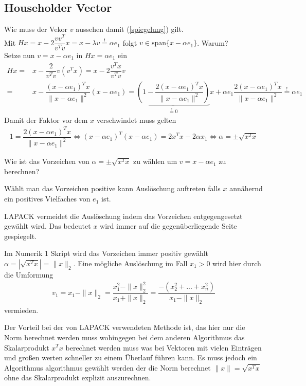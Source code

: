 \subsection{Householder Vector}
Wie muss der Vekor $v$ aussehen damit (\ref{spiegelung}) gilt.\\
\glqq Mit $Hx = x - 2\dfrac{vv^T}{v^Tv} x = x - \lambda v \overset{!}{=} \alpha e_1$ folgt $v \in \text{span}\{x - \alpha e_1\}$. \grqq{} \cite{num1}Warum?\\
  Setze nun $v = x - \alpha e_1$ in $Hx = \alpha e_1 $ ein
\begin{align*}
	Hx =& x - \dfrac{2}{v^Tv}v(v^Tx) = x - 2\dfrac{v^Tx}{v^Tv}v\\
	=& x - \dfrac{(x - \alpha e_1)^Tx}{\|x - \alpha e_1\|^2} (x - \alpha e_1)
	=\underbrace{\left(1 - \dfrac{2(x - \alpha e_1)^Tx}{\|x - \alpha e_1\|^2}\right)}_{ \overset{!}{=} 0 } x + \alpha e_1 \dfrac{2(x - \alpha e_1)^Tx}{\|x - \alpha e_1\|^2}  \overset{!}{=} \alpha e_1
\end{align*}
Damit der Faktor vor dem $x$ verschwindet muss gelten
\begin{align*}
	1 = \dfrac{2(x - \alpha e_1)^Tx}{\|x - \alpha e_1\|^2} \Leftrightarrow (x - \alpha e_1)^T(x - \alpha e_1) = 2 x^T x - 2\alpha x_1 \Leftrightarrow \alpha = \pm \sqrt{x^Tx}
\end{align*}

Wie ist das Vorzeichen von $\alpha = \pm \sqrt{x^Tx}$ zu wählen um $ v = x - \alpha e_1$ zu berechnen?

Wählt man das Vorzeichen positive kann Auslöschung auftreten falls $x$ annähernd ein positives Vielfaches von $e_1$ ist.

LAPACK \cite{DGEQR2} vermeidet die Auslöschung indem das Vorzeichen entgegengesetzt gewählt wird. Das bedeutet $x$ wird immer auf die gegenüberliegende Seite gespiegelt.

Im Numerik 1 Skript \cite{num1} wird das Vorzeichen immer positiv gewählt\\ $\alpha = |\sqrt{x^Tx}| = \|x\|_2$. Eine mögliche Auslöschung im Fall $ x_1 > 0$ wird hier durch die Umformung 
\begin{align}
	v_1 = x_1 - \|x\|_2 = \dfrac{x_1^2 - \|x\|_2^2}{x_1 + \|x\|_2}
	=\dfrac{-(x_2^2+...+x_n^2)}{x_1 - \|x\|_2}
\end{align}
vermieden.

Der Vorteil bei der von LAPACK verwendeten Methode ist, das hier nur die Norm berechnet werden muss wohingegen bei dem anderen Algorithmus das Skalarprodukt $x^Tx$ berechnet werden muss was bei Vektoren mit vielen Einträgen und großen werten schneller zu einem Überlauf führen kann. Es muss jedoch ein Algorithmus algorithmus gewählt werden der die Norm berechnet $\|x\|=\sqrt{x^Tx}$ ohne das Skalarprodukt explizit auszurechnen.


